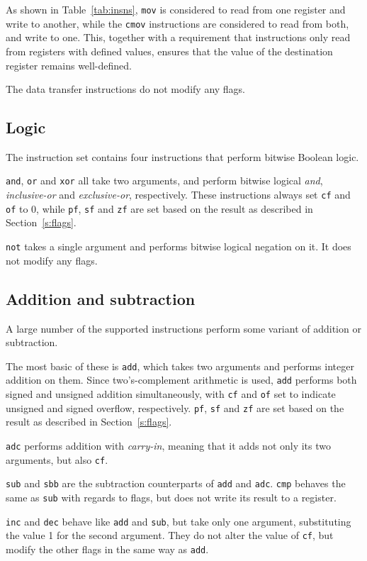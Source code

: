 \documentclass[a4paper,11pt]{kth-mag}
\begin{document}
As shown in Table~\ref{tab:insns}, \verb|mov| is considered to read from one register and write to another, while the \verb|cmov| instructions are considered to read from both, and write to one.
This, together with a requirement that instructions only read from registers with defined values, ensures that the value of the destination register remains well-defined.

The data transfer instructions do not modify any flags.

\subsection{Logic}

The instruction set contains four instructions that perform bitwise Boolean logic.

\verb|and|, \verb|or| and \verb|xor| all take two arguments, and perform bitwise logical \emph{and}, \emph{inclusive-or} and \emph{exclusive-or}, respectively.
These instructions always set \verb|cf| and \verb|of| to 0, while \verb|pf|, \verb|sf| and \verb|zf| are set based on the result as described in Section~\ref{s:flags}.

\verb|not| takes a single argument and performs bitwise logical negation on it.
It does not modify any flags.

\subsection{Addition and subtraction}

A large number of the supported instructions perform some variant of addition or subtraction.

The most basic of these is \verb|add|, which takes two arguments and performs integer addition on them.
Since two's-complement arithmetic is used, \verb|add| performs both signed and unsigned addition simultaneously, with \verb|cf| and \verb|of| set to indicate unsigned and signed overflow, respectively.
\verb|pf|, \verb|sf| and \verb|zf| are set based on the result as described in Section~\ref{s:flags}.

\verb|adc| performs addition with \emph{carry-in}, meaning that it adds not only its two arguments, but also \verb|cf|.

\verb|sub| and \verb|sbb| are the subtraction counterparts of \verb|add| and \verb|adc|.
\verb|cmp| behaves the same as \verb|sub| with regards to flags, but does not write its result to a register.

\verb|inc| and \verb|dec| behave like \verb|add| and \verb|sub|, but take only one argument, substituting the value 1 for the second argument.
They do not alter the value of \verb|cf|, but modify the other flags in the same way as \verb|add|.
\end{document}
